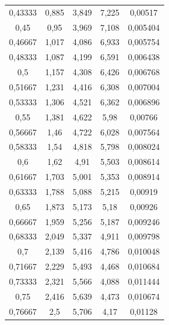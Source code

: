 \documentclass{fkssolpub}
\begin{document}
\begin{table}[h!]
\begin{subtable}[c]{0.5\textwidth}
\begin{tabular}{|c|c|c|c|c|}
0,43333 & 0,885 & 3,849 & 7,225 & 0,00517 \\
0,45 & 0,95 & 3,969 & 7,108 & 0,005404 \\
0,46667 & 1,017 & 4,086 & 6,933 & 0,005754 \\
0,48333 & 1,087 & 4,199 & 6,591 & 0,006438 \\
0,5 & 1,157 & 4,308 & 6,426 & 0,006768 \\
0,51667 & 1,231 & 4,416 & 6,308 & 0,007004 \\
0,53333 & 1,306 & 4,521 & 6,362 & 0,006896 \\
0,55 & 1,381 & 4,622 & 5,98 & 0,00766 \\
0,56667 & 1,46 & 4,722 & 6,028 & 0,007564 \\
0,58333 & 1,54 & 4,818 & 5,798 & 0,008024 \\
0,6 & 1,62 & 4,91 & 5,503 & 0,008614 \\
0,61667 & 1,703 & 5,001 & 5,353 & 0,008914 \\
0,63333 & 1,788 & 5,088 & 5,215 & 0,00919 \\
0,65 & 1,873 & 5,173 & 5,18 & 0,00926 \\
0,66667 & 1,959 & 5,256 & 5,187 & 0,009246 \\
0,68333 & 2,049 & 5,337 & 4,911 & 0,009798 \\
0,7 & 2,139 & 5,416 & 4,786 & 0,010048 \\
0,71667 & 2,229 & 5,493 & 4,468 & 0,010684 \\
0,73333 & 2,321 & 5,566 & 4,088 & 0,011444 \\
0,75 & 2,416 & 5,639 & 4,473 & 0,010674 \\
0,76667 & 2,5 & 5,706 & 4,17 & 0,01128 \\
			\hline
		\end{tabular}


\end{subtable}
\end{table}
\end{document}
